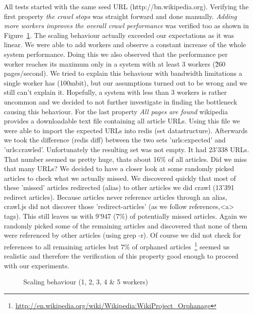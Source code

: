 All tests started with the same seed URL (http://bn.wikipedia.org). Verifying the first property \emph{the crawl stops} was straight forward and done manually. \emph{Adding more workers improves the overall crawl performance} was verified too as shown in Figure~\ref{plot:exp_001}. The scaling behaviour actually exceeded our expectations as it was linear. We were able to add workers and observe a constant increase of the whole system performance. Doing this we also observed that the performance per worker reaches its maximum only in a system with at least 3 workers (\~260 pages/second). We tried to explain this behaviour with bandwidth limitations a single worker has (100mbit), but our assumptions turned out to be wrong and we still can't explain it. Hopefully, a system with less than 3 workers is rather uncommon and we decided to not further investigate in finding the bottleneck causing this behaviour.
\newline
\newline
For the last property \emph{All pages are found} wikipedia provides a downloadable text file containing all article URLs. Using this file we were able to import the expected URLs into redis (set datastructure). Afterwards we took the difference (redis diff) between the two sets 'urls:expected' and 'urls:crawled'. Unfortunately the resulting set was not empty. It had 23'338 URLs. That number seemed us pretty huge, thats about 16\% of all articles. Did we miss that many URLs? We decided to have a closer look at some randomly picked articles to check what we actually missed. We discovered quickly that most of these 'missed' articles redirected (alias) to other articles we did crawl (13'391 redirect articles). Because articles never reference articles through an alias, crawl.js did not discover those 'redirect-articles' (as we follow references,<a> tags). This still leaves us with 9'947 (7\%) of potentially missed articles. Again we randomly picked some of the remaining articles and discovered that none of them were referenced by other articles (using grep -r). Of course we did not check for references to all remaining articles but 7\% of orphaned articles~\footnote{\url{http://en.wikipedia.org/wiki/Wikipedia:WikiProject_Orphanage}} seemed us realistic and therefore the verification of this property good enough to proceed with our experiments.
\newline
\newline
\begin{figure}
\centering
\caption{Scaling behaviour (1, 2, 3, 4 \& 5 workers)}
\label{plot:exp_001}
\end{figure}

